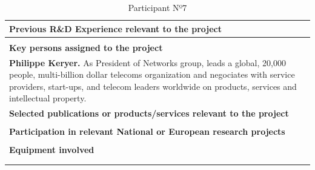 \begin{longtable}[H]{|p{0.7cm}|p{4cm}|p{7cm}|p{1.3cm}|}
	\multicolumn{4}{|p{13cm}|}{\textbf{Previous R\&D Experience relevant to the project}}  \\ \hline
	
	\multicolumn{4}{|p{13cm}|}{}  \\ \hline
	
	\multicolumn{4}{|p{13cm}|}{\textbf{Key persons assigned to the project}}   \\ \hline
	
	\multicolumn{4}{|p{13cm}|}{\textbf{Philippe Keryer.}  As President of Networks group, leads a global, 20,000 people, multi-billion dollar telecoms organization and negociates with service providers, start-ups, and telecom leaders worldwide on products, services and intellectual property.}  \\ \hline
	
	\multicolumn{4}{|p{13cm}|}{\textbf{Selected publications or products/services relevant to the project}}  \\ \hline
	
	\multicolumn{4}{|p{13cm}|}{}  \\ \hline
	
	\multicolumn{4}{|p{13cm}|}{\textbf{Participation in relevant National or European research projects}}  \\ \hline
	
	\multicolumn{4}{|p{13cm}|}{}  \\ \hline
	
	\multicolumn{4}{|p{13cm}|}{\textbf{Equipment involved}}  \\ \hline
	
	\multicolumn{4}{|p{13cm}|}{}  \\ \hline
	\caption{Participant Nº7}
\end{longtable}

